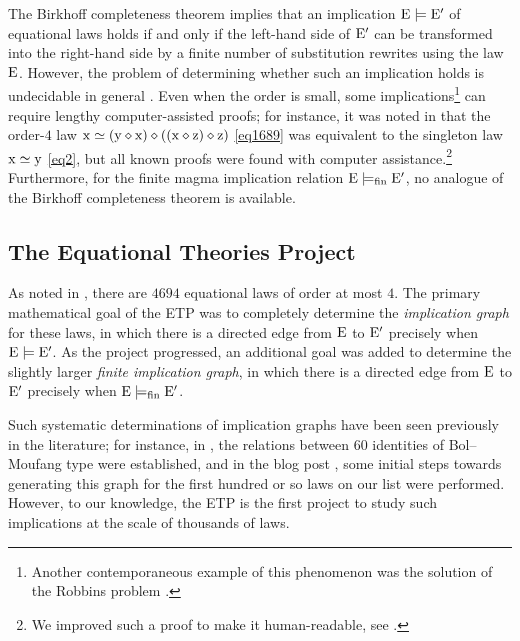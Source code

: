 The Birkhoff completeness theorem \cite[Th.~3.5.14]{term-rewriting} implies that an implication ${\mathrm{E}} \models {\mathrm{E}'}$ of equational laws holds if and only if the left-hand side of ${\mathrm{E}'}$ can be transformed into the right-hand side by a finite number of substitution rewrites using the law $\mathrm{E}$. However, the problem of determining whether such an implication holds is undecidable in general \cite{mckenzie}. Even when the order is small, some implications\footnote{Another contemporaneous example of this phenomenon was the solution of the Robbins problem \cite{robbins}.} can require lengthy computer-assisted proofs; for instance, it was noted in \cite{Kisielewicz2} that the order-$4$ law $\mathrm{x} \simeq (\mathrm{y} \diamond \mathrm{x}) \diamond ((\mathrm{x} \diamond \mathrm{z}) \diamond \mathrm{z})$ \eqref{eq1689} was equivalent to the singleton law $\mathrm{x} \simeq \mathrm{y}$ \eqref{eq2}, but all known proofs were found with computer assistance.\footnote{We improved such a proof to make it human-readable, see \cite[Theorem~4.5]{ETP_blueprint}.}  Furthermore, for the finite magma implication relation ${\mathrm{E}} \models_{\mathrm{fin}} {\mathrm{E}'}$, no analogue of the Birkhoff completeness theorem is available.

\subsection{The Equational Theories Project}

As noted in , there are $\num{4694}$ equational laws of order at most $4$. The primary mathematical goal of the ETP was to completely determine the \emph{implication graph} for these laws, in which there is a directed edge from $\mathrm{E}$ to ${\mathrm{E}'}$ precisely when ${\mathrm{E}} \models {\mathrm{E}'}$. As the project progressed, an additional goal was added to determine the slightly larger \emph{finite implication graph}, in which there is a directed edge from $\mathrm{E}$ to ${\mathrm{E}'}$ precisely when ${\mathrm{E}} \models_{\mathrm{fin}} {\mathrm{E}'}$.

Such systematic determinations of implication graphs have been seen previously in the literature; for instance, in \cite{phillips-vojtechovsky}, the relations between $60$ identities of Bol--Moufang type were established, and in the blog post \cite[\S 17]{Wolfram_2022}, some initial steps towards generating this graph for the first hundred or so laws on our list were performed. However, to our knowledge, the ETP is the first project to study such implications at the scale of thousands of laws.

